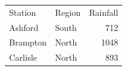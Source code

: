 \documentclass{article}
\begin{document}
\begin{tabular}{llr}
Station & Region & Rainfall \\
Ashford & South & 712 \\
Brampton & North & 1048 \\
Carlisle & North & 893 \\
\end{tabular}
\end{document}

